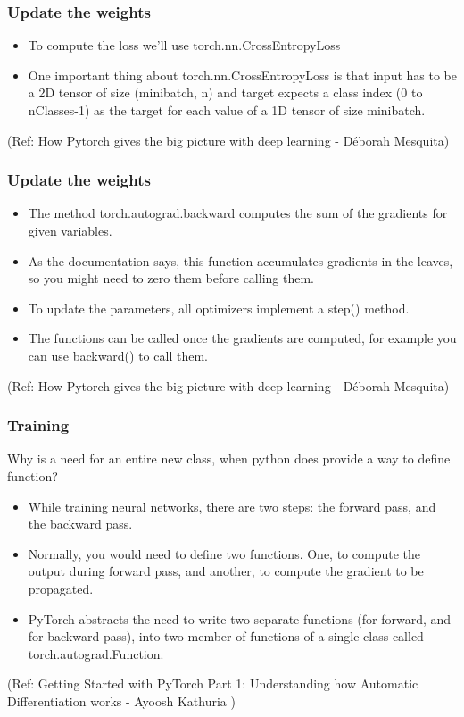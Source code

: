 \begin{frame}[fragile] \frametitle{Update the weights}
\begin{itemize}
\item To compute the loss we'll use torch.nn.CrossEntropyLoss
\item 
One important thing about torch.nn.CrossEntropyLoss is that input has to be a 2D tensor of size (minibatch, n) and target expects a class index (0 to nClasses-1) as the target for each value of a 1D tensor of size minibatch.
\end{itemize}

  {\tiny (Ref: How Pytorch gives the big picture with deep learning - Déborah Mesquita)}
\end{frame}

\begin{frame}[fragile] \frametitle{Update the weights}
\begin{itemize}
\item The method torch.autograd.backward computes the sum of the gradients for given variables. 
\item As the documentation says, this function accumulates gradients in the leaves, so you might need to zero them before calling them. 
\item To update the parameters, all optimizers implement a step() method. 
\item The functions can be called once the gradients are computed, for example you can use backward() to call them.
\end{itemize}

  {\tiny (Ref: How Pytorch gives the big picture with deep learning - Déborah Mesquita)}
\end{frame}





\begin{frame}[fragile] \frametitle{Training}
Why is a need for an entire new class, when python does provide a way to define function?

\begin{itemize}
\item While training neural networks, there are two steps: the forward pass, and the backward pass. 
\item Normally, you would need to define two functions. One, to compute the output during forward pass, and another, to compute the gradient to be propagated.
\item PyTorch abstracts the need to write two separate functions (for forward, and for backward pass), into two member of functions of a single class called torch.autograd.Function.
\end{itemize}

{\tiny (Ref: Getting Started with PyTorch Part 1: Understanding how Automatic Differentiation works - Ayoosh Kathuria )}
\end{frame}

